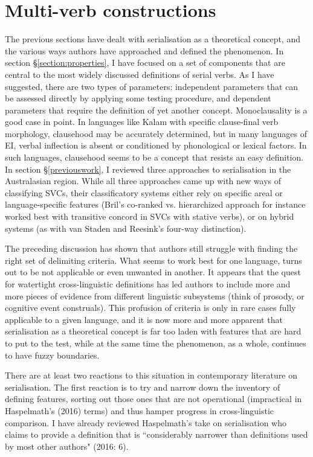 \section{Multi-verb constructions} \label{section:multi-verbconstructions}

The previous sections have dealt with serialisation as a theoretical concept, and the various ways authors have approached and defined the phenomenon. In section §\ref{section:properties}, I have focused on a set of components that are central to the most widely discussed definitions of serial verbs. As I have suggested, there are two types of parameters: independent parameters that can be assessed directly by applying some testing procedure, and dependent parameters that require the definition of yet another concept. Monoclausality is a good case in point. In languages like Kalam with specific clause-final verb morphology, clausehood may be accurately determined, but in many languages of EI, verbal inflection is absent or conditioned by phonological or lexical factors. In such languages, clausehood seems to be a concept that resists an easy definition. In section §\ref{previouswork}, I reviewed three approaches to serialisation in the Australasian region. While all three approaches came up with new ways of classifying SVCs, their classificatory systems either rely on specific areal or language-specific features (Bril's co-ranked vs. hierarchized approach for instance worked best with transitive concord in SVCs with stative verbs), or on hybrid systems (as with van Staden and Reesink's four-way distinction).

The preceding discussion has shown that authors still struggle with finding the right set of delimiting criteria. What seems to work best for one language, turns out to be not applicable or even unwanted in another. It appears that the quest for watertight cross-linguistic definitions has led authors to include more and more pieces of evidence from different linguistic subsystems (think of prosody, or cognitive event construals). This profusion of criteria is only in rare cases fully applicable to a given language, and it is now more and more apparent that serialisation as a theoretical concept is far too laden with features that are hard to put to the test, while at the same time the phenomenon, as a whole, continues to have fuzzy boundaries. 

There are at least two reactions to this situation in contemporary literature on serialisation. The first reaction is to try and narrow down the inventory of defining features, sorting out those ones that are not operational (impractical in Haspelmath's (2016) terms) and thus hamper progress in cross-linguistic comparison. I have already reviewed Haspelmath's take on serialisation who claims to provide a definition that is ``considerably narrower than definitions used by most other authors" (2016: 6). 

